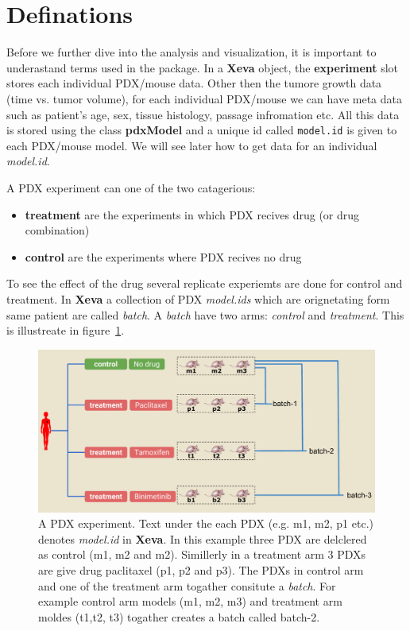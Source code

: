 \documentclass{article}\usepackage[]{graphicx}\usepackage[usenames,dvipsnames]{color}
\begin{document}
\section{Definations}
Before we further dive into the analysis and visualization, it is important to underastand terms used in the  package.
In a \textbf{Xeva} object, the \textbf{experiment} slot stores each individual PDX/mouse data. Other then the tumore growth data (time vs. tumor volume), for each individual PDX/mouse we can have meta data such as patient's age, sex, tissue histology, passage infromation etc.
All this data is stored using the class \textbf{pdxModel} and a unique id called \texttt{model.id} is given to each PDX/mouse model.
We will see later how to get data for an individual \textit{model.id}.

A PDX experiment can one of the two catagerious:
\begin{itemize}
  \item \textbf{treatment} are the experiments in which PDX recives drug (or drug combination)
  \item \textbf{control} are the experiments where PDX recives no drug
\end{itemize}

To see the effect of the drug several replicate experiemts are done for control and treatment.
In \textbf{Xeva} a collection of PDX \textit{model.ids} which are orignetating form same patient are called \textit{batch}. A \textit{batch} have two arms: \textit{control} and \textit{treatment}. This is illustreate in figure~\ref{fig:1}.

\begin{figure}[!ht]
    \centering
    \includegraphics[keepaspectratio=true,width=1\textwidth]{figure/Xeva_batch_2.pdf}
    \caption{A PDX experiment. Text under the each PDX (e.g. m1, m2, p1 etc.) denotes \textit{model.id} in \textbf{Xeva}. In this example three PDX are delclered as control (m1, m2 and m2). Simillerly in a treatment arm 3 PDXs are give drug paclitaxel (p1, p2 and p3). The PDXs in control arm and one of the treatment arm togather consitute a \textit{batch}. For example control arm models (m1, m2, m3) and treatment arm moldes (t1,t2, t3) togather creates a batch called batch-2. } \label{fig:1}
\end{figure}
\end{document}
